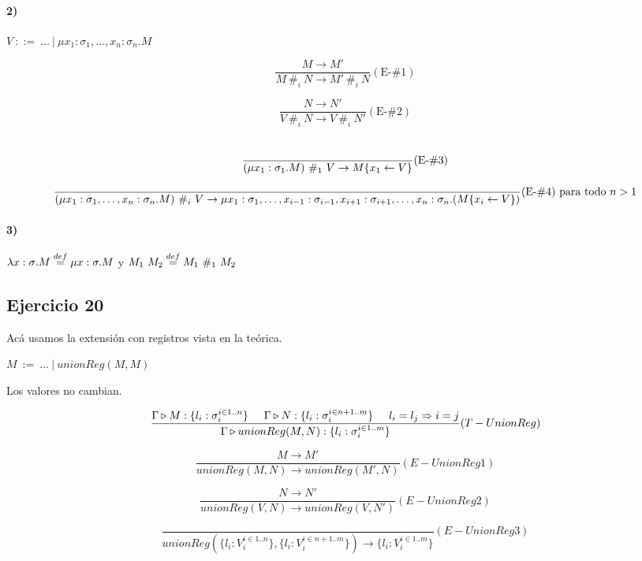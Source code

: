 \documentclass[10pt,a4paper, landscape]{article}
\begin{document}
\vspace*{5mm}
\paragraph{2)} $V~::=~\dots~|~\mu x_1:\sigma_1,\dots,x_n:\sigma_n.M$
\begin{multicols}{2}
$$\frac{M\to M'}{M~\#_i~N \to M'~\#_i~N}(\text{E-}\#1)$$

\vspace*{5mm}
$$\frac{N\to N'}{V~\#_i~N \to V~\#_i~N'}(\text{E-}\#2)$$\

$$\frac{}{(\mu x_1:\sigma_1.M)~\#_1~V \to M\{x_1\leftarrow V\}}(\text{E-}\#3)$$
\vfill

\end{multicols}
\vspace*{5mm}
$$\frac{}{(\mu x_1:\sigma_1,\dots,x_n:\sigma_n.M)~\#_i~V \to \mu x_1:\sigma_1,\dots,x_{i-1}:\sigma_{i-1},x_{i+1}:\sigma_{i+1},\dots,x_n:\sigma_n.(M\{x_i\leftarrow V\})}(\text{E-}\#4) \text{ para todo } n > 1$$

\paragraph{3)} $\lambda x: \sigma \text{.} M\overset{def}{=} \mu x:\sigma.M$ y $M_1~M_2\overset{def}{=} M_1~\#_1~M_2$

\newpage
\subsection{Ejercicio 20}
Acá usamos la extensión con registros vista en la teórica.

$M~:=~\dots~|~unionReg(M,M)$

Los valores no cambian.

$$\frac{\Gamma\triangleright M : \{l_i:\sigma_i^{i\in 1..n}\}\hspace*{5mm}\Gamma\triangleright N : \{l_i:\sigma_i^{i\in n+1..m}\}\hspace*{5mm}l_i=l_j \Rightarrow i = j}{\Gamma\triangleright unionReg(M,N) : \{l_i:\sigma_i^{i\in 1..m}\}}(T-UnionReg)$$

\begin{multicols}{2}

\vspace*{5mm}
$$\frac{M\to M'}{unionReg(M,N)\to unionReg(M',N)}(E-UnionReg1)$$

\vspace*{5mm}
$$\frac{N\to N'}{unionReg(V,N)\to unionReg(V,N')}(E-UnionReg2)$$

\vspace*{5mm}
$$\frac{}{unionReg(\{l_i:V_i^{i\in 1..n}\},\{l_i:V_i^{i\in n+1..m}\})\to \{l_i:V_i^{i\in 1..m}\}}(E-UnionReg3)$$
\end{multicols}
\end{document}
